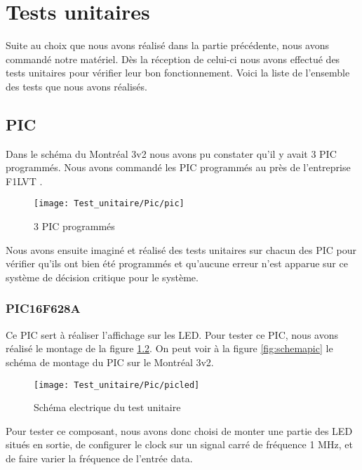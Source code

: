 \chapter{Tests unitaires}

Suite au choix que nous avons réalisé dans la partie précédente, nous avons commandé notre matériel. Dès la réception de celui-ci nous avons effectué des tests unitaires pour vérifier leur bon fonctionnement. Voici la liste de l'ensemble des tests que nous avons réalisés.




\section{PIC}
\label{sec:pic}

Dans le schéma du Montréal 3v2 nous avons pu constater qu'il y avait 3 PIC programmés. Nous avons commandé les PIC programmés au près de l'entreprise F1LVT \cite{montreal}.


\begin{figure}[!h]
  \centering
  \texttt{[image: Test\_unitaire/Pic/pic]}
  \caption{3 PIC programmés}
  \label{fig:pic}
\end{figure}

Nous avons ensuite imaginé et réalisé des tests unitaires sur chacun des PIC pour vérifier qu'ils ont bien été programmés et qu'aucune erreur n'est apparue sur ce système de décision critique pour le système.

\subsection{PIC16F628A}
\label{sec:picled}

Ce PIC sert à réaliser l'affichage sur les LED. Pour tester ce PIC, nous avons réalisé le montage de la figure \ref{fig:picled}. On peut voir à la figure \ref{fig:schemapic} le schéma de montage du PIC sur le Montréal 3v2.

\begin{figure}[!h]
  \centering
  \texttt{[image: Test\_unitaire/Pic/picled]}
  \caption{Schéma electrique du test unitaire}
  \label{fig:picled}
\end{figure}


Pour tester ce composant, nous avons donc choisi de monter une partie des LED situés en sortie, de configurer le \og clock\fg{} sur un signal carré de fréquence 1 MHz, et de faire varier la fréquence de l'entrée \og data\fg{}.


